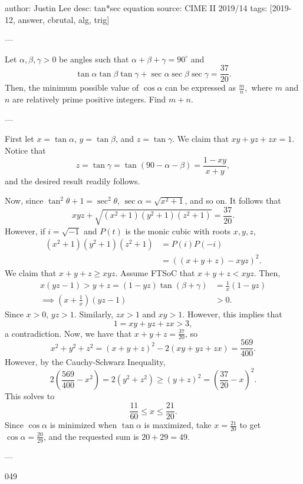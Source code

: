 author: Justin Lee
desc: tan*sec equation
source: CIME II 2019/14
tags: [2019-12, answer, cbrutal, alg, trig]

---

Let $\alpha, \beta, \gamma>0$ be angles such that $\alpha+\beta+\gamma=90^\circ$ and \[\tan\alpha\tan\beta\tan\gamma+\sec\alpha\sec\beta\sec\gamma=\frac{37}{20}.\]Then, the minimum possible value of $\cos \alpha$ can be expressed as $\tfrac mn,$ where $m$ and $n$ are relatively prime positive integers$.$ Find $m+n.$

---

First let $x=\tan\alpha$, $y=\tan\beta$, and $z=\tan\gamma$. We claim that $xy+yz+zx=1$. Notice that \[z=\tan\gamma=\tan(90-\alpha-\beta)=\frac{1-xy}{x+y},\]
and the desired result readily follows.

Now, since $\tan^2\theta+1=\sec^2\theta$, $\sec\alpha=\sqrt{x^2+1}$, and so on. It follows that \[xyz+\sqrt{(x^2+1)(y^2+1)(z^2+1)}=\frac{37}{20}.\]
However, if $i=\sqrt{-1}$ and $P(t)$ is the monic cubic with roots $x,y,z$,
\begin{align*}
    (x^2+1)(y^2+1)(z^2+1)&=P(i)P(-i)\\
    &=((x+y+z)-xyz)^2.
\end{align*}
We claim that $x+y+z\ge xyz$. Assume FTSoC that $x+y+z<xyz$. Then,
\begin{align*}
    x(yz-1)>y+z=(1-yz)\tan(\beta+\gamma)&=\frac1x(1-yz)\\
    \implies \left(x+\frac1x\right)(yz-1)&>0.
\end{align*}
Since $x>0$, $yz>1$. Similarly, $zx>1$ and $xy>1$. However, this implies that \[1=xy+yz+zx>3,\]
a contradiction. Now, we have that $x+y+z=\tfrac{37}{20}$, so \[x^2+y^2+z^2=(x+y+z)^2-2(xy+yz+zx)=\frac{569}{400}.\]
However, by the Cauchy-Schwarz Inequality, \[2\left(\frac{569}{400}-x^2\right)=2(y^2+z^2)\ge (y+z)^2=\left(\frac{37}{20}-x\right)^2.\]
This solves to \[\frac{11}{60}\le x\le\frac{21}{20}.\]
Since $\cos\alpha$ is minimized when $\tan\alpha$ is maximized, take $x=\frac{21}{20}$ to get $\cos\alpha=\frac{20}{29}$, and the requested sum is $20+29=49$.

---

049
